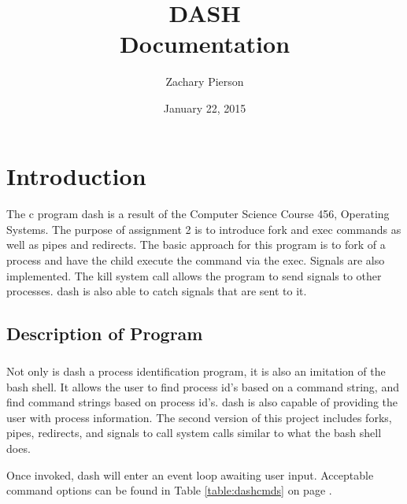 \documentclass[10pt]{article}
\title{\textbf{DASH} \\Documentation}
\date{January 22, 2015}
\author{Zachary Pierson}
\begin{document}
\maketitle

\newpage
\tableofcontents
\newpage

\section{Introduction}
\paragraph{}
The c program dash is a result of the Computer Science Course 456, Operating Systems. The purpose of assignment 2 is to introduce fork and exec commands as well as pipes and redirects.  The basic approach for this program is to fork of a process and have the child execute the command via the exec. Signals are also implemented. The kill system call allows the program to send signals to other processes. dash is also able to catch signals that are sent to it.


\subsection{Description of Program}
\subparagraph{}
Not only is dash a process identification program, it is also an imitation of the bash shell. It allows the user to find process id's based on a command string, and find command strings based on process id's. dash is also capable of providing the user with process information. The second version of this project includes forks, pipes, redirects, and signals to call system calls similar to what the bash shell does.

Once invoked, dash will enter an event loop awaiting user input. Acceptable command options can be found in Table \ref{table:dashcmds} on page \pageref{table:dashcmds}.
\end{document}
